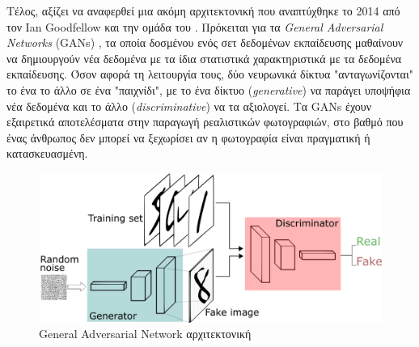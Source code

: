 \medskip
Τέλος, αξίζει να αναφερθεί μια ακόμη αρχιτεκτονική που αναπτύχθηκε το 2014 από τον Ian Goodfellow και την ομάδα του \cite{Goodfellow2014}. Πρόκειται για τα \textit{General Adversarial Networks} (GANs) , τα οποία δοσμένου ενός σετ δεδομένων εκπαίδευσης μαθαίνουν να δημιουργούν νέα δεδομένα με τα ίδια στατιστικά χαρακτηριστικά με τα δεδομένα εκπαίδευσης. Όσον αφορά τη λειτουργία τους, δύο νευρωνικά δίκτυα "ανταγωνίζονται" το ένα το άλλο σε ένα "παιχνίδι", με το ένα δίκτυο (\textit{generative}) να παράγει υποψήφια νέα δεδομένα και το άλλο (\textit{discriminative}) να τα αξιολογεί. Τα GANs έχουν εξαιρετικά αποτελέσματα στην παραγωγή ρεαλιστικών φωτογραφιών, στο βαθμό που ένας άνθρωπος δεν μπορεί να ξεχωρίσει αν η φωτογραφία είναι πραγματική ή κατασκευασμένη. 

\medskip
\begin{figure}[h]
  \centering
  \includegraphics[scale=0.4]{images/gan.png}
  \caption{General Adversarial Network αρχιτεκτονική}
  \label{fig:gan}
\end{figure}

